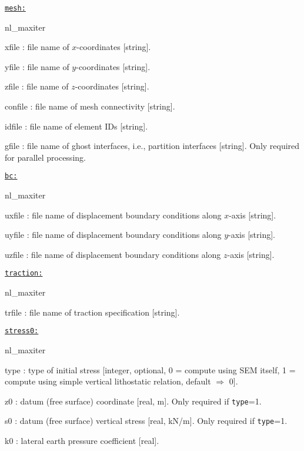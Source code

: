 \texttt{\underline{mesh:}}
\begin{adescription}{nl\_maxiter}
  \item[xfile] : file name of $x$-coordinates [string].
  \item[yfile] : file name of $y$-coordinates [string].
  \item[zfile] : file name of $z$-coordinates [string].
  \item[confile]: file name of mesh connectivity [string].
  \item[idfile]: file name of element IDs [string].
  \item[gfile]: file name of ghost interfaces, i.e., partition interfaces [string]. Only required for parallel processing.\\
\end{adescription}

\texttt{\underline{bc:}}
\begin{adescription}{nl\_maxiter}
  \item[uxfile]: file name of displacement boundary conditions along $x$-axis [string].
  \item[uyfile]: file name of displacement boundary conditions along $y$-axis [string].
  \item[uzfile]: file name of displacement boundary conditions along $z$-axis [string].\\
\end{adescription}

\texttt{\underline{traction:}}
\begin{adescription}{nl\_maxiter}
  \item[trfile]: file name of traction specification [string].\\
\end{adescription}

\texttt{\underline{stress0:}}
\begin{adescription}{nl\_maxiter}
  \item[type]: type of initial stress [integer, optional, 0 = compute using SEM itself, 1 = compute using simple vertical lithostatic relation, default $\Rightarrow$ 0].
  \item[z0]: datum (free surface) coordinate [real, m]. Only required if \texttt{type}=1.
  \item[s0]: datum (free surface) vertical stress [real, kN/m]. Only required if \texttt{type}=1.
  \item[k0]: lateral earth pressure coefficient [real].
  \\
\end{adescription}

